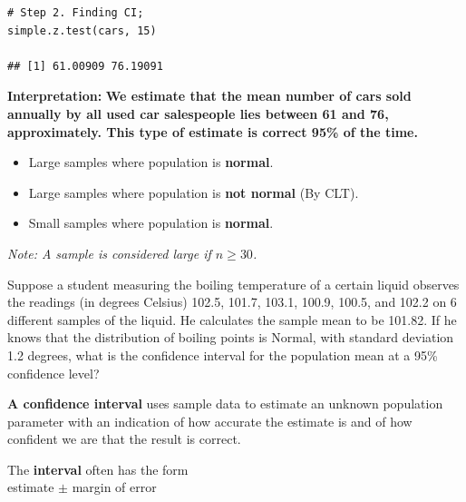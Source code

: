 \begin{example}
\begin{tcolorbox}[colback=gray!10, colframe=black!45, arc=2mm]
\begin{verbatim}
# Step 2. Finding CI;
simple.z.test(cars, 15)

## [1] 61.00909 76.19091
\end{verbatim}
\end{tcolorbox}

\vspace{1em}

\noindent\textbf{Interpretation:} \textbf{We estimate that the mean number of cars sold annually by all used car salespeople lies between 61 and 76, approximately. This type of estimate is correct 95\% of the time.}

\end{example}

\begin{tcolorbox}[colback=blue!5!white, colframe=blue!75!black,
  title=\textbf{Cases Where Valid}, fonttitle=\bfseries,
  coltitle=white, colbacktitle=blue!90!black, arc=2mm]

\begin{itemize}
  \item Large samples where population is \textbf{normal}.
  \item Large samples where population is \textbf{not normal} (By CLT).
  \item Small samples where population is \textbf{normal}.
\end{itemize}

\textit{Note: A sample is considered large if $n \geq 30$.}
\end{tcolorbox}

\begin{example}
Suppose a student measuring the boiling temperature of a certain liquid observes the readings (in degrees Celsius) 102.5, 101.7, 103.1, 100.9, 100.5, and 102.2 on 6 different samples of the liquid. He calculates the sample mean to be 101.82. If he knows that the distribution of boiling points is Normal, with standard deviation 1.2 degrees, what is the confidence interval for the population mean at a 95\% confidence level?\\
\end{example}
\textbf{A confidence interval} uses sample data to estimate an unknown population parameter with an indication of how accurate the estimate is and of how confident we are that the result is correct.

\vspace{1em}

The \textbf{interval} often has the form\\
\hspace*{2em}estimate $\pm$ margin of error

